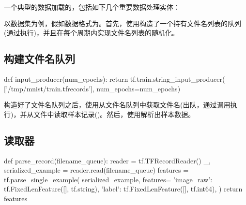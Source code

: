 \begin{content}

一个典型的数据加载的，包括如下几个重要数据处理实体：

\begin{enum}
\end{enum}

以数据集为例，假如数据格式为。首先，使用构造了一个持有文件名列表的队列(通过执行)，并且在每个周期内实现文件名列表的随机化。

\subsection{构建文件名队列}

\begin{leftbar}
\begin{python}
def input_producer(num_epochs):
  return tf.train.string_input_producer(
    ['/tmp/mnist/train.tfrecords'], num_epochs=num_epochs)
\end{python}
\end{leftbar}

构造好了文件名队列之后，使用从文件名队列中获取文件名(出队，通过调用执行)，并从文件中读取样本记录()。然后，使用解析出样本数据。

\subsection{读取器}

\begin{leftbar}
\begin{python}
def parse_record(filename_queue):
  reader = tf.TFRecordReader()
  _, serialized_example = reader.read(filename_queue)
  features = tf.parse_single_example(
      serialized_example,
      features={
          'image_raw': tf.FixedLenFeature([], tf.string),
          'label': tf.FixedLenFeature([], tf.int64),
      })
  return features
\end{python}
\end{leftbar}


\end{content}
